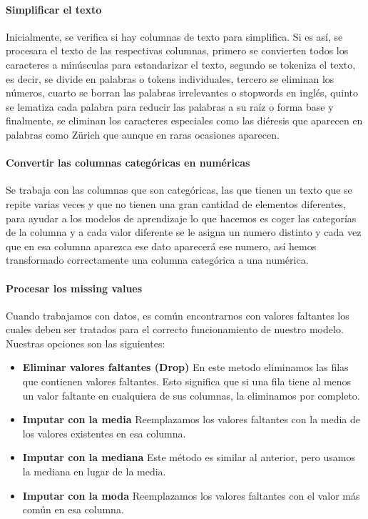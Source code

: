 \documentclass{report}
\begin{document}
{                \paragraph*{Simplificar el texto} {
                    Inicialmente, se verifica si hay columnas de texto para simplifica. Si es así, se procesara el texto de las respectivas columnas, primero se convierten todos los caracteres a minúsculas para estandarizar el texto, segundo se tokeniza el texto, es decir, se divide en palabras o tokens individuales, tercero se eliminan los números, cuarto se borran las palabras irrelevantes o stopwords en inglés, quinto se lematiza cada palabra para reducir las palabras a su raíz o forma base y finalmente, se eliminan los caracteres especiales como las diéresis que aparecen en palabras como Zürich que aunque en raras ocasiones aparecen. }
                \paragraph*{Convertir las columnas categóricas en numéricas} {
                    Se trabaja con las columnas que son categóricas, las que tienen un texto que se repite varias veces y que no tienen una gran cantidad de elementos diferentes, para ayudar a los modelos de aprendizaje lo que hacemos es coger las categorías de la columna y a cada valor diferente se le asigna un numero distinto y cada vez que en esa columna aparezca ese dato aparecerá ese numero, así hemos transformado correctamente una columna categórica a una numérica.}
                \paragraph*{Procesar los missing values} { 
                    Cuando trabajamos con datos, es común encontrarnos con valores faltantes los cuales deben ser tratados para el correcto funcionamiento de nuestro modelo. 
                    Nuestras opciones son las siguientes:
                    }
                \begin{itemize}
                    \item \textbf{Eliminar valores faltantes (Drop)}  
                    {En este metodo eliminamos las filas que contienen valores faltantes. Esto significa que si una fila tiene al menos un valor faltante en cualquiera de sus columnas, la eliminamos por completo.}
                    \item \textbf{Imputar con la media}  
                      {Reemplazamos los valores faltantes con la media de los valores existentes en esa columna.}
                    \item \textbf{Imputar con la mediana}  
                      {Este método es similar al anterior, pero usamos la mediana en lugar de la media.}
                    \item \textbf{Imputar con la moda}  
                      { Reemplazamos los valores faltantes con el valor más común en esa columna.}
                \end{itemize}
}
\end{document}
